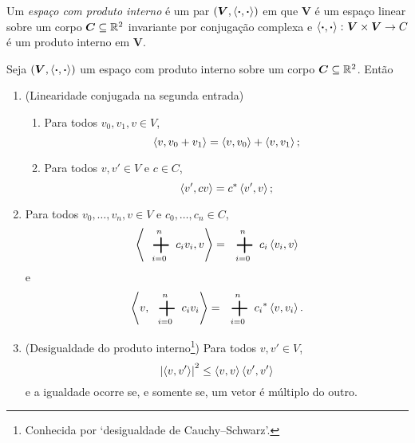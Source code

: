 \begin{definition}
Um \emph{espaço com produto interno} é um par $(\bm V,\left\langle{\bm{\cdot}},{\bm{\cdot}}\right\rangle)$ em que $\bm V$ é um espaço linear sobre um corpo $\bm C \subseteq \mathbb{R}^2$ invariante por conjugação complexa e $\left\langle{\bm{\cdot}},{\bm{\cdot}}\right\rangle\colon \bm V \times \bm V \to C$ é um produto interno em $\bm V$.
\end{definition}

\begin{proposition}
Seja $(\bm V,\left\langle{\bm{\cdot}},{\bm{\cdot}}\right\rangle)$ um espaço com produto interno sobre um corpo $\bm C \subseteq \mathbb{R}^2$. Então
	\begin{enumerate}
	\item (Linearidade conjugada na segunda entrada)
		\begin{enumerate}
		\item Para todos $v_0,v_1,v \in V$,
			\begin{equation*}
			\left\langle{v},{v_0+v_1}\right\rangle = \left\langle{v},{v_0}\right\rangle + \left\langle{v},{v_1}\right\rangle;
			\end{equation*}
		\item Para todos $v,v' \in V$ e $c \in C$,
			\begin{equation*}
			\left\langle{v'},{cv}\right\rangle = {c}^{\ast}\left\langle{v'},{v}\right\rangle;
			\end{equation*}
		\end{enumerate}
	\item Para todos $v_0,\ldots,v_n,v \in V$ e $c_0,\ldots,c_n \in C$,
		\begin{equation*}
		\inte{\sum_{i=0}^n c_iv_i}{v} = \sum_{i=0}^n c_i\inte{v_i}{v}
		\end{equation*}
e
		\begin{equation*}
		\inte{v}{\sum_{i=0}^n c_iv_i} = \sum_{i=0}^n \conju{c_i}\inte{v}{v_i}.
		\end{equation*}
	\item (Desigualdade do produto interno\footnote{Conhecida por `desigualdade de Cauchy–Schwarz'.}) Para todos $v,v' \in V$,
		\begin{equation*}
		\left\vert{\left\langle{v},{v'}\right\rangle}\right\vert^2 \leq \left\langle{v},{v}\right\rangle\left\langle{v'},{v'}\right\rangle
		\end{equation*}
		e a igualdade ocorre se, e somente se, um vetor é múltiplo do outro.
		\end{enumerate}
\end{proposition}
